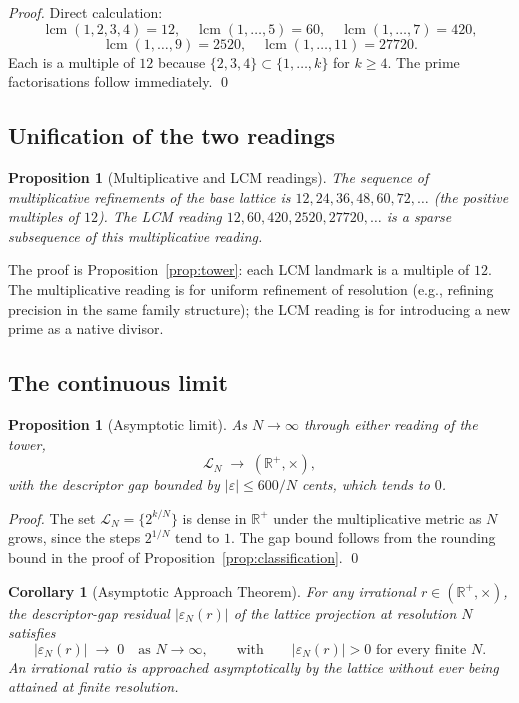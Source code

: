 \documentclass[11pt,a4paper]{article}
\newtheorem{corollary}[theorem]{Corollary}
\newtheorem{proposition}[theorem]{Proposition}
\theoremstyle{definition}
\theoremstyle{remark}
\newcommand{\R}{\mathbb{R}}
\DeclareMathOperator{\lcm}{lcm}
\newcommand{\eps}{\varepsilon}
\begin{document}
\begin{proof}
Direct calculation:
\[
\lcm(1,2,3,4)=12,\quad \lcm(1,\ldots,5)=60,\quad \lcm(1,\ldots,7)=420,
\]
\[
\lcm(1,\ldots,9)=2520,\quad \lcm(1,\ldots,11)=27720.
\]
Each is a multiple of $12$ because $\{2,3,4\}\subset\{1,\ldots,k\}$ for $k\ge 4$. The prime factorisations follow immediately. \qed
\end{proof}

\subsection{Unification of the two readings}

\begin{proposition}[Multiplicative and LCM readings]\label{prop:unification}
The sequence of multiplicative refinements of the base lattice is $12,24,36,48,60,72,\ldots$ (the positive multiples of $12$). The LCM reading $12,60,420,2520,27720,\ldots$ is a sparse subsequence of this multiplicative reading.
\end{proposition}

The proof is Proposition~\ref{prop:tower}: each LCM landmark is a multiple of $12$. The multiplicative reading is for uniform refinement of resolution (e.g., refining precision in the same family structure); the LCM reading is for introducing a new prime as a native divisor.

\subsection{The continuous limit}

\begin{proposition}[Asymptotic limit]\label{prop:limit}
As $N\to\infty$ through either reading of the tower,
\[
\mathcal{L}_{N} \;\longrightarrow\; (\R^{+},\times),
\]
with the descriptor gap bounded by $|\eps|\le 600/N$ cents, which tends to $0$.
\end{proposition}

\begin{proof}
The set $\mathcal{L}_{N}=\{2^{k/N}\}$ is dense in $\R^{+}$ under the multiplicative metric as $N$ grows, since the steps $2^{1/N}$ tend to $1$. The gap bound follows from the rounding bound in the proof of Proposition~\ref{prop:classification}. \qed
\end{proof}

\begin{corollary}[Asymptotic Approach Theorem]\label{cor:asymptotic-approach}
For any irrational $r \in (\R^{+},\times)$, the descriptor-gap residual $|\varepsilon_{N}(r)|$ of the lattice projection at resolution $N$ satisfies
\[
|\varepsilon_{N}(r)| \;\longrightarrow\; 0 \quad \text{as } N \to \infty, \qquad\text{with}\qquad |\varepsilon_{N}(r)| > 0 \text{ for every finite } N.
\]
An irrational ratio is approached asymptotically by the lattice without ever being attained at finite resolution.
\end{corollary}
\end{document}
